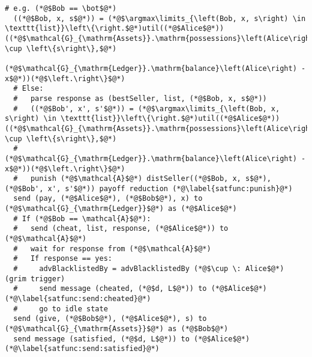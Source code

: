 \begin{lstlisting}[label=satfunc, style=numbers]
    # e.g. (*@$Bob == \bot$@*)
  ((*@$Bob, x, s$@*)) = (*@$\argmax\limits_{\left(Bob, x, s\right) \in \texttt{list}}\left\{\right.$@*)util((*@$Alice$@*))((*@$\mathcal{G}_{\mathrm{Assets}}.\mathrm{possessions}\left(Alice\right) \cup \left\{s\right\},$@*)
        (*@$\mathcal{G}_{\mathrm{Ledger}}.\mathrm{balance}\left(Alice\right) - x$@*))(*@$\left.\right\}$@*)
  # Else:
  #   parse response as (bestSeller, list, (*@$Bob, x, s$@*))
  #   ((*@$Bob', x', s'$@*)) = (*@$\argmax\limits_{\left(Bob, x, s\right) \in \texttt{list}}\left\{\right.$@*)util((*@$Alice$@*))((*@$\mathcal{G}_{\mathrm{Assets}}.\mathrm{possessions}\left(Alice\right) \cup \left\{s\right\},$@*)
  #      (*@$\mathcal{G}_{\mathrm{Ledger}}.\mathrm{balance}\left(Alice\right) - x$@*))(*@$\left.\right\}$@*)
  #   punish (*@$\mathcal{A}$@*) distSeller((*@$Bob, x, s$@*), (*@$Bob', x', s'$@*)) payoff reduction (*@\label{satfunc:punish}@*)
  send (pay, (*@$Alice$@*), (*@$Bob$@*), x) to (*@$\mathcal{G}_{\mathrm{Ledger}}$@*) as (*@$Alice$@*)
  # If (*@$Bob == \mathcal{A}$@*):
  #   send (cheat, list, response, (*@$Alice$@*)) to (*@$\mathcal{A}$@*)
  #   wait for response from (*@$\mathcal{A}$@*)
  #   If response == yes:
  #     advBlacklistedBy = advBlacklistedBy (*@$\cup \: Alice$@*) (grim trigger)
  #     send message (cheated, (*@$d, L$@*)) to (*@$Alice$@*) (*@\label{satfunc:send:cheated}@*)
  #     go to idle state
  send (give, (*@$Bob$@*), (*@$Alice$@*), s) to (*@$\mathcal{G}_{\mathrm{Assets}}$@*) as (*@$Bob$@*)
  send message (satisfied, (*@$d, L$@*)) to (*@$Alice$@*) (*@\label{satfunc:send:satisfied}@*)
\end{lstlisting}
